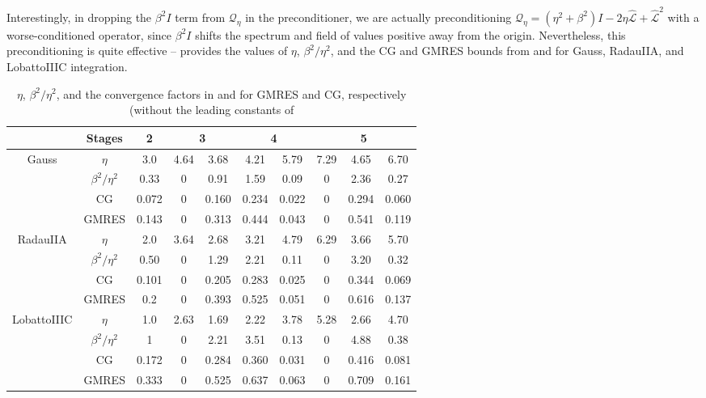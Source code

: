 \documentclass[review]{siamart}
\begin{document}
Interestingly, in dropping the $\beta^2 I$ term from $\mathcal{Q}_\eta$ in the
preconditioner, we are actually preconditioning $\mathcal{Q}_\eta = 
(\eta^2+\beta^2)I - 2\eta \widehat{\mathcal{L}} + \widehat{\mathcal{L}}^2$ with a
worse-conditioned operator, since $\beta^2I$ shifts the spectrum and field of values
positive away from the origin. Nevertheless, this preconditioning is quite effective --
 provides the values of $\eta$, $\beta^2/\eta^2$, and the CG and GMRES
bounds from  and  for Gauss, RadauIIA, and LobattoIIIC
integration.

%
{
\renewcommand{\tabcolsep}{4pt}
\renewcommand{\arraystretch}{1.15}
\begin{table}[!ht]
  \centering
  \begin{tabular}{| c | c | c | cc | cc | ccc |}  %
  \hline
& Stages & 2 & \multicolumn{2}{c}{3} & \multicolumn{2}{|c}{4} & \multicolumn{3}{|c|}{5} \\\hline\hline
\multirow{ 3}{*}{Gauss}
&$\eta$ & 3.0 & 4.64 & 3.68 & 4.21 & 5.79 & 7.29 & 4.65 & 6.70 \\
&$\beta^2/\eta^2$ & 0.33 & 0 & 0.91 & 1.59 & 0.09 & 0 & 2.36 & 0.27 \\
&CG & 0.072 & 0 & 0.160 & 0.234 & 0.022 & 0 & 0.294 & 0.060 \\
&GMRES & 0.143 & 0 & 0.313 & 0.444 & 0.043 & 0 & 0.541 & 0.119  \\\hline
\multirow{ 3}{*}{RadauIIA}
&$\eta$ & 2.0 & 3.64 & 2.68 & 3.21 & 4.79 & 6.29 & 3.66 & 5.70 \\
&$\beta^2/\eta^2$ & 0.50 & 0 & 1.29 & 2.21 & 0.11 & 0 & 3.20 & 0.32	\\
&CG & 0.101 & 0 & 0.205 & 0.283 & 0.025 & 0 & 0.344 & 0.069 \\
&GMRES & 0.2 & 0 & 0.393 & 0.525 & 0.051 & 0 & 0.616 & 0.137 \\\hline
\multirow{ 3}{*}{LobattoIIIC}
&$\eta$ & 1.0 & 2.63 & 1.69 & 2.22 & 3.78 & 5.28 & 2.66 & 4.70 \\
&$\beta^2/\eta^2$ & 1 & 0 & 2.21 & 3.51 & 0.13 & 0 & 4.88 & 0.38 \\
&CG & 0.172 & 0 & 0.284 & 0.360 & 0.031 & 0 & 0.416 & 0.081 \\
&GMRES & 0.333 & 0 & 0.525 & 0.637 & 0.063 & 0 &  0.709 & 0.161 \\
  \hline
  \end{tabular}
  \caption{$\eta$, $\beta^2/\eta^2$, and the convergence factors in 
  and  for GMRES and CG, respectively (without the leading constants of
}
\end{table}}
\end{document}
